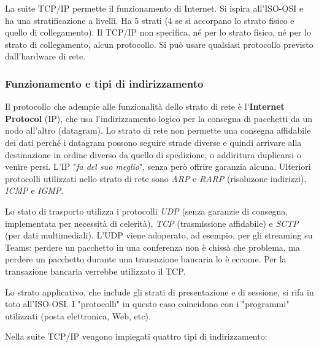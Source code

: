         La suite TCP/IP permette il funzionamento di Internet. Si ispira all'ISO-OSI e ha una stratificazione a livelli. Ha 5 strati (4 se si accorpano lo strato fisico e quello di collegamento). Il TCP/IP non specifica, né per lo strato fisico, né per lo strato di collegamento, alcun protocollo. Si può usare qualsiasi protocollo previsto dall'hardware di rete. 
    
    \subsubsection{Funzionamento e tipi di indirizzamento}
        Il protocollo che adempie alle funzionalità dello strato di rete è l'\textbf{Internet Protocol} (IP), che usa l'indirizzamento logico per la consegna di pacchetti da un nodo all'altro (datagram). Lo strato di rete non permette una consegna affidabile dei dati perché i datagram possono seguire strade diverse e quindi arrivare alla destinazione in ordine diverso da quello di spedizione, o addiritura duplicarsi o venire persi. 
        L'IP "\textit{fa del suo meglio}", senza però offrire garanzia alcuna. Ulteriori protocolli utilizzati nello strato di rete sono \textit{ARP} e \textit{RARP} (risoluzone indirizzi), \textit{ICMP} e \textit{IGMP}.
    
        \vspace{3mm}
    
        Lo stato di trasporto utilizza i protocolli \textit{UDP} (senza garanzie di consegna, implementata per necessità di celerità), \textit{TCP} (trasmissione affidabile) e \textit{SCTP} (per dati multimediali). L'UDP viene adoperato, ad esempio, per gli streaming su Teams: perdere un pacchetto in una conferenza non è chissà che problema, ma perdere un pacchetto durante una transazione bancaria lo è eccome. Per la transazione bancaria verrebbe utilizzato il TCP.
    
        \vspace{3mm}
    
        Lo strato applicativo, che include gli strati di presentazione e di sessione, si rifa in toto all'ISO-OSI. I "protocolli" in questo caso coincidono con i "programmi" utilizzati (posta elettronica, Web, etc).
    
        \vspace{3mm}
    
        Nella suite TCP/IP vengono impiegati quattro tipi di indirizzamento:
    
